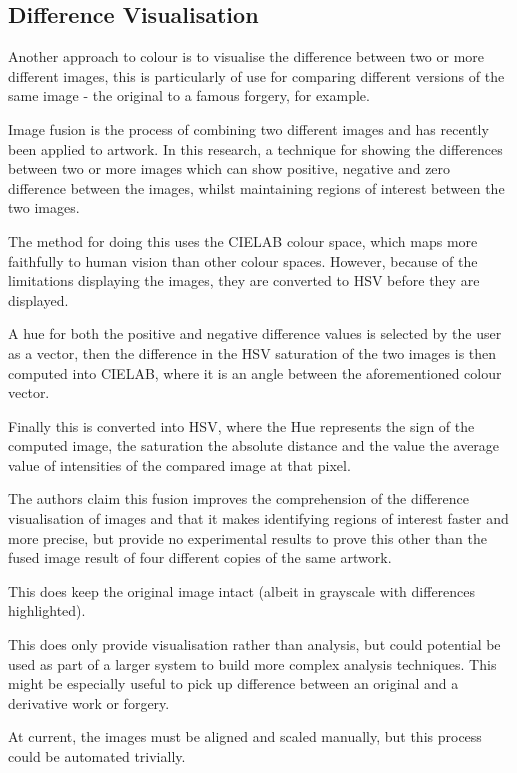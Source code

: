 \documentclass[conference]{IEEEtran}
\begin{document}
\subsection{Difference Visualisation}
Another approach to colour is to visualise the difference between two or more
different images, this is particularly of use for comparing different versions
of the same image - the original to a famous forgery, for example.

Image fusion is the process of combining two different images and has recently
been applied to artwork\cite{blazek13image}. In this research, a technique for
showing the differences between two or more images which can show positive,
negative and zero difference between the images, whilst maintaining regions of
interest between the two images.

The method for doing this uses the CIELAB colour space, which maps more
faithfully to human vision than other colour spaces. However, because of the
limitations displaying the images, they are converted to \gls{HSV} before they
are displayed.

A hue for both the positive and negative difference values is selected by the
user as a vector, then the difference in the \gls{HSV} saturation of the two
images is then computed into CIELAB, where it is an angle between the
aforementioned colour vector.

Finally this is converted into \gls{HSV}, where the Hue represents the sign of
the computed image, the saturation the absolute distance and the value the
average value of intensities of the compared image at that pixel.

The authors claim this fusion improves the comprehension of the difference
visualisation of images and that it makes identifying regions of interest
faster and more precise, but provide no experimental results to prove this
other than the fused image result of four different copies of the same artwork.

This does keep the original image intact (albeit in grayscale with differences
highlighted).

This does only provide visualisation rather than analysis, but could potential
be used as part of a larger system to build more complex analysis techniques.
This might be especially useful to pick up difference between an original and a
derivative work or forgery.

At current, the images must be aligned and scaled manually, but this process
could be automated trivially.
\end{document}
